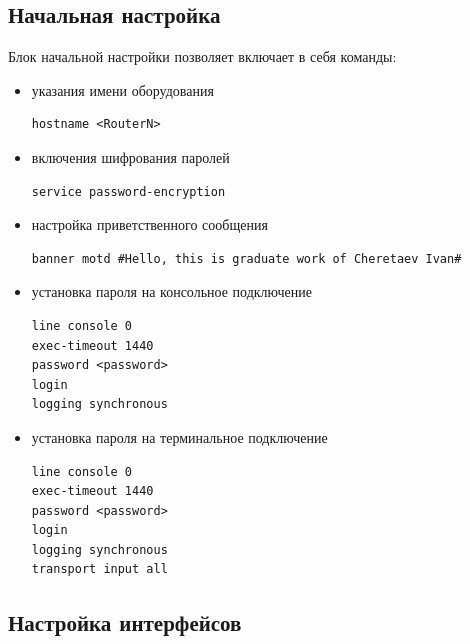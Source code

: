 \subsection{Начальная настройка}

Блок начальной настройки позволяет включает в себя команды\cite{cisco-command}:

\begin{itemize}
	\item указания имени оборудования
	
	\begin{lstlisting}
hostname <RouterN>
	\end{lstlisting}
	
	\item включения шифрования паролей
	
	\begin{lstlisting}
service password-encryption		
	\end{lstlisting}
	
	\item настройка приветственного сообщения
	
	\begin{lstlisting}
banner motd #Hello, this is graduate work of Cheretaev Ivan#
	\end{lstlisting}	
	
	\item установка пароля на консольное подключение
	
	\begin{lstlisting}
line console 0
exec-timeout 1440
password <password>
login
logging synchronous
	\end{lstlisting}
	
	\item установка пароля на терминальное подключение
	
\begin{lstlisting}
line console 0
exec-timeout 1440
password <password>
login
logging synchronous
transport input all
\end{lstlisting}
	
\end{itemize}


\subsection{Настройка интерфейсов}

